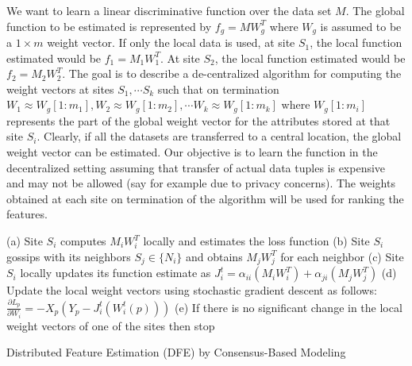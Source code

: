 We want to learn a linear discriminative function over the data set $M$. The global function to be
estimated is represented by $f_{g} = M W_{g}^{T} $ where $W_g$ is assumed to be a $1 \times m$ weight vector.
If only the local data is used, at site $S_1$, the local function estimated would be $f_1 = M_1 W_{1}^{T}$.
At site $S_2$, the local function estimated would be $f_2 = M_2 W_{2}^{T}$.
The goal is to describe a de-centralized algorithm for computing the weight vectors at sites $S_1, \cdots S_k$
such that on termination $W_{1} \approx W_g[1:m_1], W_2 \approx W_g[1:m_2], \cdots W_k \approx W_g[1:m_k]$
where $W_g[1:m_i]$ represents the part of the global weight vector for the attributes stored at that site $S_i$.
Clearly, if all the datasets are transferred to a central location, the global weight vector can be estimated.
Our objective is to learn the function in the decentralized setting assuming that transfer of actual data tuples is
expensive and may not be allowed (say for example due to privacy concerns). The weights obtained at each site on
termination of the algorithm will be used for ranking the features.

\begin{algorithm}[t]
\small
{

\BlankLine

 {
  (a) Site $S_i$ computes $M_i W_i^T$ locally and estimates the loss function\;
  (b) Site $S_i$ gossips with its neighbors $S_j \in \{N_i\}$ and obtains $M_j W_j^T$ for each neighbor\;
  (c) Site $S_i$ locally updates its function estimate as $J_i^t = \alpha_{ii}(M_i W_i^T) + \alpha_{ji} (M_j W_j^T)$ \;
  (d) Update the local weight vectors using stochastic gradient descent as follows:
        $\frac{\partial L_p}{\partial W_i} = -X_p (Y_p - J_i^t(W_i^t(p)))$\;
  (e) If there is no significant change in the local weight vectors of one of the sites then stop
 }
 
\caption{Distributed Feature Estimation (DFE) by Consensus-Based Modeling}
\label{alg:fs}
}
\end{algorithm}

